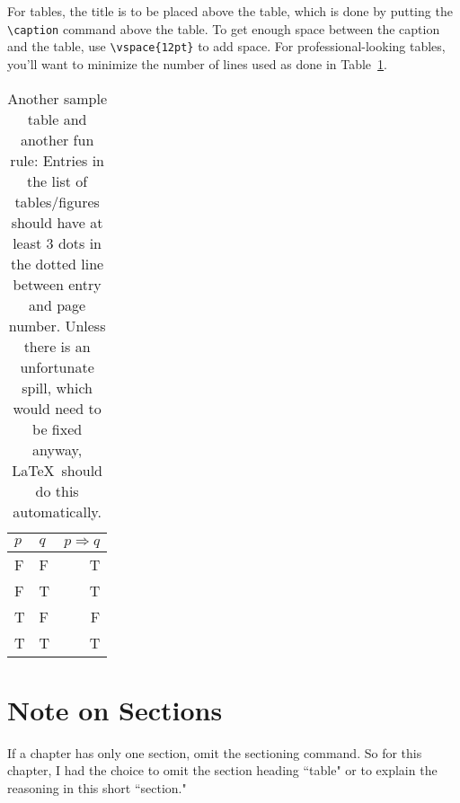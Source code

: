 For tables, the title is to be placed above the table,
which is done by putting the \verb+\caption+ command
above the table.
To get enough space between the caption and the table,
use \verb+\vspace{12pt}+ to add space.
For professional-looking tables, you'll want to minimize
the number of lines used as done in Table~\ref{tablelabel2}.

\begin{table}[h]
\caption{Another sample table and another fun rule:
Entries in the list of tables/figures
should have at least 3 dots in the dotted
line between entry and page number. Unless there is
an unfortunate spill, which would need to be fixed anyway,
\LaTeX \ should do this automatically.
}
\label{tablelabel2}
\vspace{12pt}
\centering
\begin{tabular}{l l  r}
\toprule
$p$ & $q$ & $p\Rightarrow q$ \\
\midrule
F   & F   & T \\
F   & T  & T \\
T  & F   & F  \\
T  & T  & T  \\
\bottomrule
\end{tabular}
\end{table}





\section{Note on Sections}

If a chapter has only one section, omit the sectioning command.
So for this chapter, I had the choice to omit the section heading
``table" or to explain the reasoning in this short ``section."
